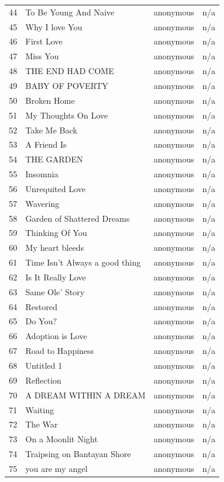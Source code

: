 \documentclass{book}
\begin{document}
\begin{table}
\begin{tabular}{llll}
44 & To Be Young And Naive & anonymous & n/a \\
45 & Why I love You & anonymous & n/a \\
46 & First Love & anonymous & n/a \\
47 & Miss You & anonymous & n/a \\
48 & THE END HAD COME & anonymous & n/a \\
49 & BABY OF POVERTY & anonymous & n/a \\
50 & Broken Home & anonymous & n/a \\
51 & My Thoughts On Love & anonymous & n/a \\
52 & Take Me Back & anonymous & n/a \\
53 & A Friend Is & anonymous & n/a \\
54 & THE GARDEN & anonymous & n/a \\
55 & Insomnia & anonymous & n/a \\
56 & Unrequited Love & anonymous & n/a \\
57 & Wavering & anonymous & n/a \\
58 & Garden of Shattered Dreams & anonymous & n/a \\
59 & Thinking Of You & anonymous & n/a \\
60 & My heart bleeds & anonymous & n/a \\
61 & Time Isn't Always a good thing & anonymous & n/a \\
62 & Is It Really Love & anonymous & n/a \\
63 & Same Ole' Story & anonymous & n/a \\
64 & Restored & anonymous & n/a \\
65 & Do You? & anonymous & n/a \\
66 & Adoption is Love & anonymous & n/a \\
67 & Road to Happiness & anonymous & n/a \\
68 & Untitled 1 & anonymous & n/a \\
69 & Reflection & anonymous & n/a \\
70 & A DREAM WITHIN A DREAM & anonymous & n/a \\
71 & Waiting & anonymous & n/a \\
72 & The War & anonymous & n/a \\
73 & On a Moonlit Night & anonymous & n/a \\
74 & Traipsing on Bantayan Shore & anonymous & n/a \\
75 & you are my angel & anonymous & n/a \\

\end{tabular}
\end{table}
\end{document}
